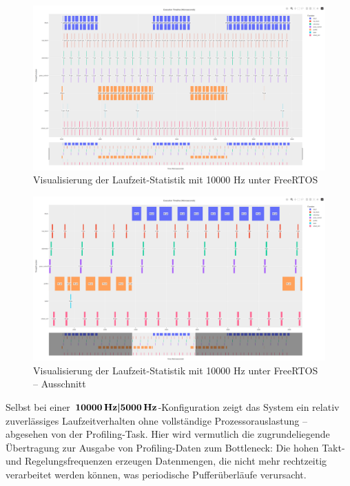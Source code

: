 \begin{figure}[H]
    \centering
    \includegraphics[width=1\textwidth]{assets/freertos_profiling_10000hz}
    \caption{Visualisierung der Laufzeit-Statistik mit 10000 Hz unter FreeRTOS}
\end{figure}
\begin{figure}[H]
    \centering
    \includegraphics[width=1\textwidth]{assets/freertos_profiling_10000hz_ausschnitt}
    \caption{Visualisierung der Laufzeit-Statistik mit 10000 Hz unter FreeRTOS --
    Ausschnitt}
\end{figure}

Selbst bei einer $\textbf{10000\,\text{Hz}|5000\,\text{Hz}}$-Konfiguration zeigt
das System ein relativ zuverlässiges Laufzeitverhalten ohne vollständige
Prozessorauslastung -- abgesehen von der Profiling-Task. Hier wird vermutlich
die zugrundeliegende Übertragung zur Ausgabe von Profiling-Daten zum Bottleneck:
Die hohen Takt- und Regelungsfrequenzen erzeugen Datenmengen, die nicht mehr
rechtzeitig verarbeitet werden können, was periodische Pufferüberläufe
verursacht.

